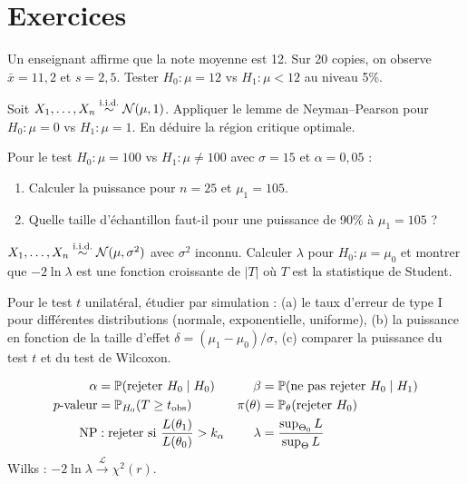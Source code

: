 \section{Exercices}

\begin{exercice}
Un enseignant affirme que la note moyenne est 12. Sur 20 copies, on observe $\bar{x}=11{,}2$ et $s=2{,}5$. Tester $H_0:\mu=12$ vs $H_1:\mu<12$ au niveau 5\%.
\end{exercice}

\begin{exercice}
Soit $X_1,\ldots,X_n\overset{\text{i.i.d.}}{\sim}\mathcal{N}(\mu,1)$. Appliquer le lemme de Neyman--Pearson pour $H_0:\mu=0$ vs $H_1:\mu=1$. En d\'eduire la r\'egion critique optimale.
\end{exercice}

\begin{exercice}
Pour le test $H_0:\mu=100$ vs $H_1:\mu\neq 100$ avec $\sigma=15$ et $\alpha=0{,}05$ :
\begin{enumerate}
\item Calculer la puissance pour $n=25$ et $\mu_1=105$.
\item Quelle taille d'\'echantillon faut-il pour une puissance de 90\% \`a $\mu_1=105$ ?
\end{enumerate}
\end{exercice}

\begin{exercice}
$X_1,\ldots,X_n\overset{\text{i.i.d.}}{\sim}\mathcal{N}(\mu,\sigma^2)$ avec $\sigma^2$ inconnu. Calculer $\lambda$ pour $H_0:\mu=\mu_0$ et montrer que $-2\ln\lambda$ est une fonction croissante de $|T|$ o\`u $T$ est la statistique de Student.
\end{exercice}

\begin{exercice}
Pour le test $t$ unilat\'eral, \'etudier par simulation : (a) le taux d'erreur de type I pour diff\'erentes distributions (normale, exponentielle, uniforme), (b) la puissance en fonction de la taille d'effet $\delta=(\mu_1-\mu_0)/\sigma$, (c) comparer la puissance du test $t$ et du test de Wilcoxon.
\end{exercice}

\begin{formules}
\begin{align*}
\alpha &= \mathbb{P}(\text{rejeter } H_0\mid H_0) & \beta &= \mathbb{P}(\text{ne pas rejeter } H_0\mid H_1) \\
p\text{-valeur} &= \mathbb{P}_{H_0}(T\geq t_{\mathrm{obs}}) & \pi(\theta) &= \mathbb{P}_\theta(\text{rejeter}\ H_0) \\
\text{NP} &: \text{rejeter si } \frac{L(\theta_1)}{L(\theta_0)}>k_\alpha &
\lambda &= \frac{\sup_{\Theta_0}L}{\sup_\Theta L}
\end{align*}
Wilks : $-2\ln\lambda\xrightarrow{\mathcal{L}}\chi^2(r)$.
\end{formules}

